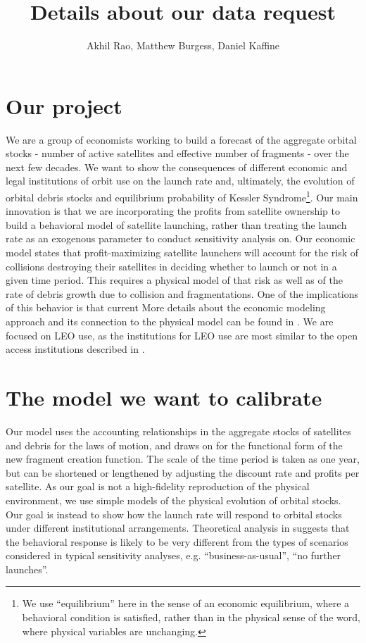 \documentclass[12pt]{article}
\title{Details about our data request}
\author{Akhil Rao, Matthew Burgess, Daniel Kaffine}
\begin{document}
	
	\maketitle
	
\section{Our project}	

We are a group of economists working to build a forecast of the aggregate orbital stocks - number of active satellites and effective number of fragments - over the next few decades. We want to show the consequences of different economic and legal institutions of orbit use on the launch rate and, ultimately, the evolution of orbital debris stocks and equilibrium probability of Kessler Syndrome\footnote{We use ``equilibrium'' here in the sense of an economic equilibrium, where a behavioral condition is satisfied, rather than in the physical sense of the word, where physical variables are unchanging.}. Our main innovation is that we are incorporating the profits from satellite ownership to build a behavioral model of satellite launching, rather than treating the launch rate as an exogenous parameter to conduct sensitivity analysis on. Our economic model states that profit-maximizing satellite launchers will account for the risk of collisions destroying their satellites in deciding whether to launch or not in a given time period. This requires a physical model of that risk as well as of the rate of debris growth due to collision and fragmentations. One of the implications of this behavior is that current  More details about the economic modeling approach and its connection to the physical model can be found in \cite{raorondinaWP}. We are focused on LEO use, as the institutions for LEO use are most similar to the open access institutions described in \cite{raorondinaWP}.
	
\section{The model we want to calibrate}

Our model uses the accounting relationships in the aggregate stocks of satellites and debris for the laws of motion, and draws on \cite{bradleywein2009} for the functional form of the new fragment creation function. The scale of the time period is taken as one year, but can be shortened or lengthened by adjusting the discount rate and profits per satellite. As our goal is not a high-fidelity reproduction of the physical environment, we use simple models of the physical evolution of orbital stocks. Our goal is instead to show how the launch rate will respond to orbital stocks under different institutional arrangements. Theoretical analysis in \cite{raorondinaWP} suggests that the behavioral response is likely to be very different from the types of scenarios considered in typical sensitivity analyses, e.g. ``business-as-usual'', ``no further launches''. \\
\end{document}
